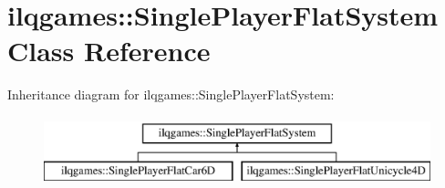 \hypertarget{classilqgames_1_1_single_player_flat_system}{}\section{ilqgames\+:\+:Single\+Player\+Flat\+System Class Reference}
\label{classilqgames_1_1_single_player_flat_system}
Inheritance diagram for ilqgames\+:\+:Single\+Player\+Flat\+System\+:\begin{figure}[H]
\begin{center}
\leavevmode
\includegraphics[height=2.000000cm]{classilqgames_1_1_single_player_flat_system}
\end{center}
\end{figure}
